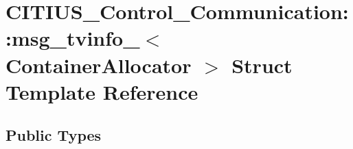 \hypertarget{struct_c_i_t_i_u_s___control___communication_1_1msg__tvinfo__}{\section{\-C\-I\-T\-I\-U\-S\-\_\-\-Control\-\_\-\-Communication\-:\-:msg\-\_\-tvinfo\-\_\-$<$ \-Container\-Allocator $>$ \-Struct \-Template \-Reference}
\label{struct_c_i_t_i_u_s___control___communication_1_1msg__tvinfo__}
}
\subsection*{\-Public \-Types}
